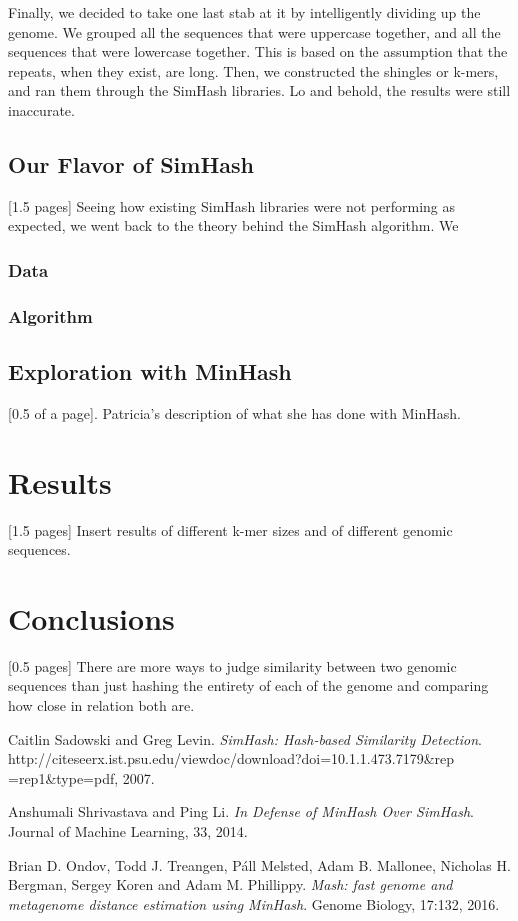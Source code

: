 \documentclass[12pt, letterpaper]{article}
\begin{document}
Finally, we decided to take one last stab at it by intelligently dividing up the genome. We grouped all the sequences that were uppercase together, and all the sequences that were lowercase together. This is based on the assumption that the repeats, when they exist, are long. Then, we constructed the shingles or k-mers, and ran them through the SimHash libraries. Lo and behold, the results were still inaccurate.   

\subsection{Our Flavor of SimHash}
[1.5 pages] Seeing how existing SimHash libraries were not performing as expected, we went back to the theory behind the SimHash algorithm. We 

\subsubsection{Data}
\subsubsection{Algorithm}


\subsection{Exploration with MinHash}
[0.5 of a page]. Patricia's description of what she has done with MinHash.





\section*{Results}
[1.5 pages] Insert results of different k-mer sizes and of different genomic sequences.

\section*{Conclusions}
[0.5 pages] There are more ways to judge similarity between two genomic sequences than just hashing the entirety of each of the genome and comparing how close in relation both are.




\begin{thebibliography}{9}


  Caitlin Sadowski and Greg Levin.
  \textit{SimHash: Hash-based Similarity Detection}.
  http://citeseerx.ist.psu.edu/viewdoc/download?doi=10.1.1.473.7179\&rep\\=rep1\&type=pdf, 
  2007.

  Anshumali Shrivastava and Ping Li.
  \textit{In Defense of MinHash Over SimHash}.
  Journal of Machine Learning, 33, 2014.

  Brian D. Ondov, Todd J. Treangen, Páll Melsted, Adam B. Mallonee, Nicholas H. Bergman, Sergey Koren and Adam M. Phillippy.
  \textit{Mash: fast genome and metagenome distance estimation using MinHash}.
  Genome Biology, 17:132, 2016.

\end{thebibliography}
\end{document}

